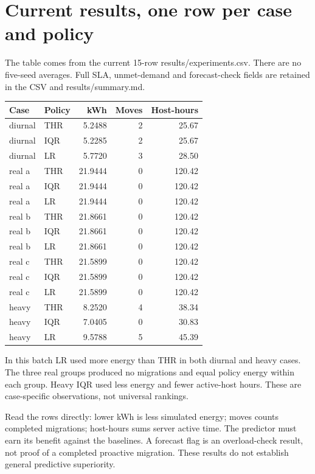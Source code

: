 \documentclass[11pt,a4paper]{article}
\begin{document}
\section{Current results, one row per case and policy}
The table comes from the current 15-row results/experiments.csv. There are no five-seed averages. Full SLA, unmet-demand and forecast-check fields are retained in the CSV and results/summary.md.
\begin{center}\small\begin{tabular}{llrrr}\toprule Case & Policy & kWh & Moves & Host-hours\\\midrule
diurnal & THR & 5.2488 & 2 & 25.67\\
diurnal & IQR & 5.2285 & 2 & 25.67\\
diurnal & LR & 5.7720 & 3 & 28.50\\
real a & THR & 21.9444 & 0 & 120.42\\
real a & IQR & 21.9444 & 0 & 120.42\\
real a & LR & 21.9444 & 0 & 120.42\\
real b & THR & 21.8661 & 0 & 120.42\\
real b & IQR & 21.8661 & 0 & 120.42\\
real b & LR & 21.8661 & 0 & 120.42\\
real c & THR & 21.5899 & 0 & 120.42\\
real c & IQR & 21.5899 & 0 & 120.42\\
real c & LR & 21.5899 & 0 & 120.42\\
heavy & THR & 8.2520 & 4 & 38.34\\
heavy & IQR & 7.0405 & 0 & 30.83\\
heavy & LR & 9.5788 & 5 & 45.39\\
\bottomrule\end{tabular}\end{center}
In this batch LR used more energy than THR in both diurnal and heavy cases. The three real groups produced no migrations and equal policy energy within each group. Heavy IQR used less energy and fewer active-host hours. These are case-specific observations, not universal rankings.\par Read the rows directly: lower kWh is less simulated energy; moves counts completed migrations; host-hours sums server active time. The predictor must earn its benefit against the baselines. A forecast flag is an overload-check result, not proof of a completed proactive migration. These results do not establish general predictive superiority.
\end{document}
